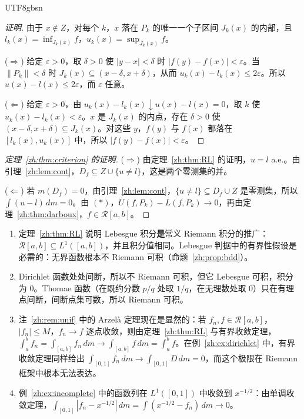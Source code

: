 \documentclass[11pt]{article}
\makeatletter
\newcommand{\envlabel}[1]{\protected@edef\@currentlabel{\themathenv}\label{#1}}
\makeatother
\begin{document}
\begin{CJK*}{UTF8}{gbsn}
\begin{proof}[证明]
由于 $x\notin Z$，对每个 $k$，$x$ 落在 $P_{k}$ 的唯一一个子区间 $J_{k}(x)$ 的内部，且 $l_{k}(x)=\inf_{J_{k}(x)}f$，$u_{k}(x)=\sup_{J_{k}(x)}f$。

($\Rightarrow$) 给定 $\varepsilon>0$，取 $\delta>0$ 使 $|y-x|<\delta$ 时 $|f(y)-f(x)|<\varepsilon$。当 $\|P_{k}\|<\delta$ 时 $J_{k}(x)\subseteq(x-\delta,x+\delta)$，从而 $u_{k}(x)-l_{k}(x)\leq2\varepsilon$。所以 $u(x)-l(x)\leq2\varepsilon$，而 $\varepsilon$ 任意。

($\Leftarrow$) 给定 $\varepsilon>0$，由 $u_{k}(x)-l_{k}(x)\downarrow u(x)-l(x)=0$，取 $k$ 使 $u_{k}(x)-l_{k}(x)<\varepsilon$。$x$ 是 $J_{k}(x)$ 的内点，存在 $\delta>0$ 使 $(x-\delta,x+\delta)\subseteq J_{k}(x)$。对这些 $y$，$f(y)$ 与 $f(x)$ 都落在 $[l_{k}(x),u_{k}(x)]$ 中，所以 $|f(y)-f(x)|<\varepsilon$。
\end{proof}

\begin{proof}[定理~\ref{zh:thm:criterion} 的证明]
($\Rightarrow$) 由定理~\ref{zh:thm:RL} 的证明，$u=l$ a.e.。由引理~\ref{zh:lem:cont}，$D_{f}\subseteq Z\cup\{u\neq l\}$，这是两个零测集的并。

($\Leftarrow$) 若 $m(D_{f})=0$，由引理~\ref{zh:lem:cont}，$\{u\neq l\}\subseteq D_{f}\cup Z$ 是零测集，所以 $\int(u-l)\,dm=0$。由 $(\ast)$，$U(f,P_{k})-L(f,P_{k})\to0$，再由定理~\ref{zh:thm:darboux}，$f\in\mathcal{R}[a,b]$。
\end{proof}

\begin{remark}\envlabel{zh:rem:riemann}
\leavevmode
\begin{enumerate}
  \item 定理~\ref{zh:thm:RL} 说明 Lebesgue 积分\textbf{是}常义 Riemann 积分的推广：$\mathcal{R}[a,b]\subseteq L^{1}([a,b])$，并且积分值相同。Lebesgue 判据中的有界性假设是必需的：无界函数根本不 Riemann 可积（命题~\ref{zh:prop:bdd}）。
  \item Dirichlet 函数处处间断，所以不 Riemann 可积，但它 Lebesgue 可积，积分为 $0$。Thomae 函数（在既约分数 $p/q$ 处取 $1/q$，在无理数处取 $0$）只在有理点间断，间断点集可数，所以 Riemann 可积。
  \item 注~\ref{zh:rem:unif} 中的 Arzelà 定理现在是显然的：若 $f_{n},f\in\mathcal{R}[a,b]$，$|f_{n}|\leq M$，$f_{n}\to f$ 逐点收敛，则由定理~\ref{zh:thm:RL} 与有界收敛定理，$\int_{a}^{b}f_{n}=\int_{[a,b]}f_{n}\,dm\to\int_{[a,b]}f\,dm=\int_{a}^{b}f$。在例~\ref{zh:ex:dirichlet} 中，有界收敛定理同样给出 $\int_{[0,1]}f_{n}\,dm\to\int_{[0,1]}D\,dm=0$，而这个极限在 Riemann 框架中根本无法表达。
  \item 例~\ref{zh:ex:incomplete} 中的函数列在 $L^{1}([0,1])$ 中收敛到 $x^{-1/2}$：由单调收敛定理，$\int_{[0,1]}|f_{n}-x^{-1/2}|\,dm=\int(x^{-1/2}-f_{n})\,dm\to0$。
\end{enumerate}
\end{remark}


\end{CJK*}
\end{document}
